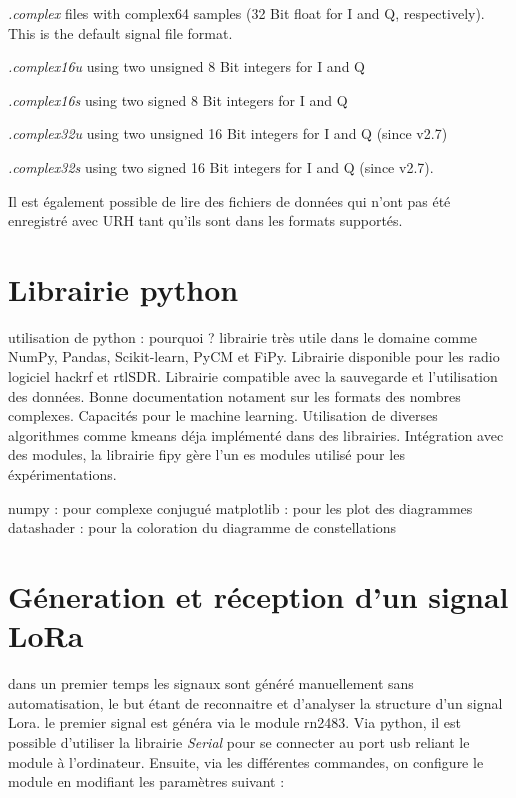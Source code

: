  \textit{.complex} files with complex64 samples (32 Bit float for I and Q, respectively). This is the default signal file format.
 
\textit{.complex16u} using two unsigned 8 Bit integers for I and Q

\textit{.complex16s} using two signed 8 Bit integers for I and Q

\textit{.complex32u} using two unsigned 16 Bit integers for I and Q (since v2.7)

\textit{.complex32s} using two signed 16 Bit integers for I and Q (since v2.7).

Il est également possible de lire des fichiers de données qui n'ont pas été enregistré avec URH tant qu'ils sont dans les formats supportés.

\section{Librairie python}

utilisation de python : pourquoi ?
librairie très utile dans le domaine comme NumPy, Pandas, Scikit-learn, PyCM et FiPy.
Librairie disponible pour les radio logiciel hackrf et rtlSDR.
Librairie compatible avec la sauvegarde et l'utilisation des données. Bonne documentation notament sur les formats des nombres complexes.
Capacités pour le machine learning. Utilisation de diverses algorithmes comme kmeans déja implémenté dans des librairies.
Intégration avec des modules, la librairie fipy gère l'un es modules utilisé pour les éxpérimentations.

numpy : pour complexe conjugué
matplotlib : pour les plot des diagrammes
datashader : pour la coloration du diagramme de constellations


\section{Géneration et réception d'un signal LoRa} \label{signallora}

dans un premier temps les signaux sont généré manuellement sans automatisation, le but étant de reconnaitre et d'analyser la structure d'un signal Lora. le premier signal est généra via le module rn2483. Via python, il est possible d'utiliser la librairie \textit{Serial} pour se connecter au port usb reliant le module à l'ordinateur. Ensuite, via les différentes commandes, on configure le module en modifiant les paramètres suivant : 

